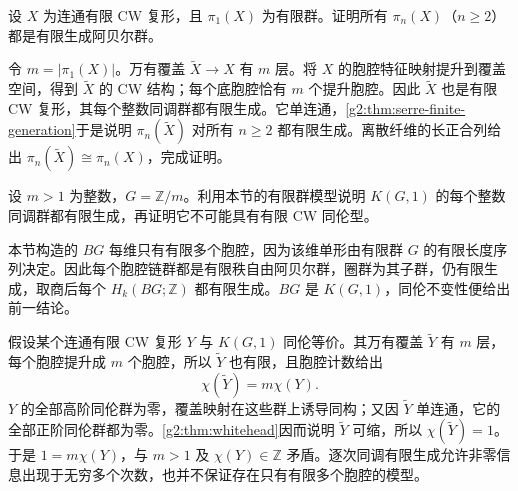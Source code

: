 \begin{exercise}\label{g2:ex:finite-fundamental-group-finiteness}
	设 \(X\) 为连通有限 CW 复形，且 \(\pi_1(X)\) 为有限群。证明所有 \(\pi_n(X)\)（\(n\ge2\)）都是有限生成阿贝尔群。
\end{exercise}
\begin{solution}
	令 \(m=|\pi_1(X)|\)。万有覆盖 \(\widetilde X\rightarrow X\) 有 \(m\) 层。将 \(X\) 的胞腔特征映射提升到覆盖空间，得到 \(\widetilde X\) 的 CW 结构；每个底胞腔恰有 \(m\) 个提升胞腔。因此 \(\widetilde X\) 也是有限 CW 复形，其每个整数同调群都有限生成。它单连通，\cref{g2:thm:serre-finite-generation}于是说明 \(\pi_n(\widetilde X)\) 对所有 \(n\ge2\) 都有限生成。离散纤维的长正合列给出 \(\pi_n(\widetilde X)\cong\pi_n(X)\)，完成证明。
\end{solution}

\begin{exercise}\label{g2:ex:finite-type-not-finite-cw}
	设 \(m>1\) 为整数，\(G=\mathbb Z/m\)。利用本节的有限群模型说明 \(K(G,1)\) 的每个整数同调群都有限生成，再证明它不可能具有有限 CW 同伦型。
\end{exercise}
\begin{solution}
	本节构造的 \(BG\) 每维只有有限多个胞腔，因为该维单形由有限群 \(G\) 的有限长度序列决定。因此每个胞腔链群都是有限秩自由阿贝尔群，圈群为其子群，仍有限生成，取商后每个 \(H_k(BG;\mathbb Z)\) 都有限生成。\(BG\) 是 \(K(G,1)\)，同伦不变性便给出前一结论。

	假设某个连通有限 CW 复形 \(Y\) 与 \(K(G,1)\) 同伦等价。其万有覆盖 \(\widetilde Y\) 有 \(m\) 层，每个胞腔提升成 \(m\) 个胞腔，所以 \(\widetilde Y\) 也有限，且胞腔计数给出
	\[
		\chi(\widetilde Y)=m\chi(Y).
	\]
	\(Y\) 的全部高阶同伦群为零，覆盖映射在这些群上诱导同构；又因 \(\widetilde Y\) 单连通，它的全部正阶同伦群都为零。\cref{g2:thm:whitehead}因而说明 \(\widetilde Y\) 可缩，所以 \(\chi(\widetilde Y)=1\)。于是 \(1=m\chi(Y)\)，与 \(m>1\) 及 \(\chi(Y)\in\mathbb Z\) 矛盾。逐次同调有限生成允许非零信息出现于无穷多个次数，也并不保证存在只有有限多个胞腔的模型。
\end{solution}

